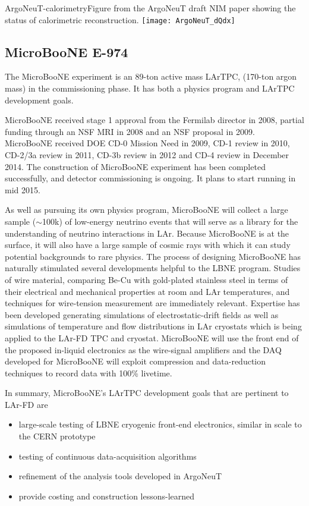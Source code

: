 \begin{cdrfigure}{ArgoNeuT-calorimetry}{Figure from the ArgoNeuT draft NIM paper showing the status of calorimetric reconstruction.}
\texttt{[image: ArgoNeuT\_dQdx]}
\end{cdrfigure}%

\subsection {MicroBooNE E-974}

The MicroBooNE experiment is an 89-ton active mass LArTPC, (170-ton argon mass) in the commissioning phase.  It has both a physics program and LArTPC development goals.  

MicroBooNE received stage 1 approval from the Fermilab director in 2008, partial funding through an NSF MRI in 2008 and an NSF proposal in 2009.  MicroBooNE received DOE CD-0 Mission Need in 2009, CD-1 review in 2010, CD-2/3a review in 2011, CD-3b review in 2012 and CD-4 review in December 2014. The construction of MicroBooNE experiment has been completed successfully, and detector commissioning is ongoing. It plans to start running in mid 2015. 

As well as pursuing its own physics program, MicroBooNE will collect a large sample ($\sim$100k) of low-energy neutrino events that will serve as a library for the understanding of neutrino interactions in 
LAr. Because MicroBooNE is at the surface, it will also have a large sample of cosmic rays with which it can study potential backgrounds to rare physics. The process of designing MicroBooNE has naturally stimulated several developments helpful to the LBNE program.  Studies of wire material, comparing Be-Cu with gold-plated stainless steel in terms of their electrical and mechanical properties at room and LAr temperatures, and techniques for wire-tension measurement are immediately relevant. Expertise has been developed generating simulations of electrostatic-drift fields as well as simulations of temperature and flow distributions in LAr cryostats which is being applied to the LAr-FD TPC and cryostat. MicroBooNE will use the front end of the proposed in-liquid electronics as the wire-signal amplifiers and the DAQ developed for MicroBooNE will exploit compression and data-reduction techniques to record data with 100\% livetime.

\noindent  In summary, MicroBooNE's LArTPC development goals that are pertinent to LAr-FD are
\begin{itemize}
\item large-scale testing of LBNE cryogenic front-end electronics, similar in scale to the CERN prototype
\item testing of continuous data-acquisition algorithms
\item refinement of the analysis tools developed in ArgoNeuT
\item provide costing and construction lessons-learned
\end{itemize}

